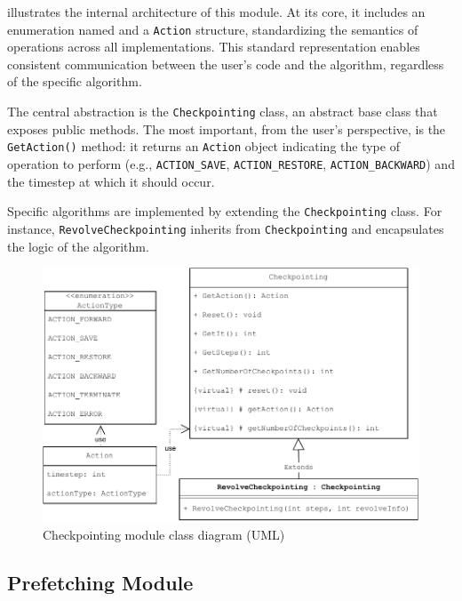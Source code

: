 \documentclass[Ingles,Final]{ic-tese-v3}
\begin{document}
 illustrates the internal architecture of this module. At its core, it includes an enumeration named  and a \texttt{Action} structure, standardizing the semantics of \checkpointing operations across all implementations. This standard representation enables consistent communication between the user's code and the \checkpointing algorithm, regardless of the specific algorithm.

The central abstraction is the \texttt{Checkpointing} class, an abstract base class that exposes public methods. The most important, from the user's perspective, is the \texttt{GetAction()} method: it returns an \texttt{Action} object indicating the type of operation to perform (e.g., \texttt{ACTION\_SAVE}, \texttt{ACTION\_RESTORE}, \texttt{ACTION\_BACKWARD}) and the timestep at which it should occur.

Specific \checkpointing algorithms are implemented by extending the \texttt{Checkpointing} class. For instance, \texttt{RevolveCheckpointing} inherits from \texttt{Checkpointing} and encapsulates the logic of the \revolve algorithm.

\begin{figure}
  \centering
  \includegraphics[width=1\linewidth,trim={0 0 0 0},clip]{figures/oss/checkpointing_uml.pdf}
  \caption[Checkpointing module class diagram]{Checkpointing module class diagram (UML)}
  \label{fig:checkpointinguml}
\end{figure}

\subsection{Prefetching Module}
\end{document}
